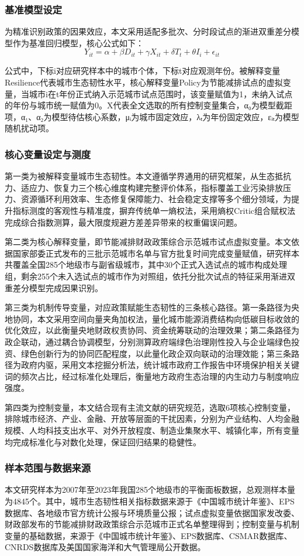 \documentclass[lang=cn,a4paper,11pt]{elegantpaper}
\begin{document}
\subsubsection{基准模型设定}
为精准识别政策的因果效应，本文采用适配多批次、分时段试点的渐进双重差分模型作为基准回归模型，核心公式如下：
\[
Y_{it} = \alpha + \beta D_{it} + \gamma X_{it} + \delta T_{t} + \theta I_{i} + \epsilon_{it}
\]


公式中，下标i对应研究样本中的城市个体，下标t对应观测年份。被解释变量Resilience代表城市生态韧性水平，核心解释变量Policy为节能减排试点的虚拟变量，当城市i在t年份正式纳入示范城市试点范围时，该变量赋值为1，未纳入试点的年份与城市统一赋值为0。X代表全文选取的所有控制变量集合，α₀为模型截距项，α₁、α₂为模型待估核心系数，μᵢ为城市固定效应，λₜ为年份固定效应，εᵢₜ为模型随机扰动项。
\subsubsection{核心变量设定与测度}
第一类为被解释变量城市生态韧性。本文遵循学界通用的研究框架，从生态抵抗力、适应力、恢复力三个核心维度构建完整评价体系，指标覆盖工业污染排放压力、资源循环利用效率、生态修复保障能力、社会稳定支撑等多个细分领域，为提升指标测度的客观性与精准度，摒弃传统单一熵权法，采用熵权\-Critic组合赋权法完成综合指数测算，最大限度规避方差差异带来的权重偏误问题。

第二类为核心解释变量，即节能减排财政政策综合示范城市试点虚拟变量。本文依据国家部委正式发布的三批示范城市名单与官方批复时间完成变量赋值，研究样本共覆盖全国285个地级市与副省级城市，其中30个正式入选试点的城市构成处理组，剩余255个未入选试点的城市作为对照组，依托分批次试点的特征采用渐进双重差分模型完成因果识别。

第三类为机制传导变量，对应政策赋能生态韧性的三条核心路径。第一条路径为央地协同，本文采用空间向量夹角加权法，量化城市能源消费结构向低碳目标收敛的优化效应，以此衡量央地财政权责协同、资金统筹联动的治理效果；第二条路径为政企联动，通过耦合协调模型，分别测算政府端绿色治理刚性投入与企业端绿色投资、绿色创新行为的协同匹配程度，以此量化政企双向联动的治理效能；第三条路径为政府内驱，采用文本挖掘分析法，统计城市政府工作报告中环境保护相关关键词的频次占比，经过标准化处理后，衡量地方政府生态治理的内生动力与制度响应强度。

第四类为控制变量，本文结合现有主流文献的研究规范，选取6项核心控制变量，排除城市经济、产业、金融、开放等层面的干扰因素，分别为产业结构、人均金融规模、人均科技支出水平、对外开放程度、制造业集聚水平、城镇化率，所有变量均完成标准化与对数化处理，保证回归结果的稳健性。
\subsubsection{样本范围与数据来源}
本文研究样本为2007年至2023年我国285个地级市的平衡面板数据，总观测样本量为4845个。其中，城市生态韧性相关指标数据来源于《中国城市统计年鉴》、EPS数据库、各地级市官方统计公报与环境质量公报；试点虚拟变量依据国家发改委、财政部发布的节能减排财政政策综合示范城市正式名单整理得到；控制变量与机制变量的基础数据，来源于《中国城市统计年鉴》、EPS数据库、CSMAR数据库、CNRDS数据库及美国国家海洋和大气管理局公开数据。
\end{document}
